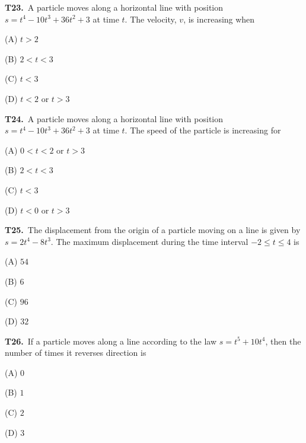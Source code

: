 \documentclass[11pt]{article}
\begin{document}
\bigskip\noindent\textbf{T23.}\ A particle moves along a horizontal line with position $s=t^4-10t^3+36t^2+3$ at time $t$. The velocity, $v$, is increasing when
\begin{list}{}{\setlength{\leftmargin}{3em}\setlength{\labelwidth}{2.5em}\setlength{\itemsep}{0pt}\setlength{\topsep}{2pt}}
\item[(A)] $t>2$
\item[(B)] $2<t<3$
\item[(C)] $t<3$
\item[(D)] $t<2$ or $t>3$
\end{list}

\bigskip\noindent\textbf{T24.}\ A particle moves along a horizontal line with position $s=t^4-10t^3+36t^2+3$ at time $t$. The speed of the particle is increasing for
\begin{list}{}{\setlength{\leftmargin}{3em}\setlength{\labelwidth}{2.5em}\setlength{\itemsep}{0pt}\setlength{\topsep}{2pt}}
\item[(A)] $0<t<2$ or $t>3$
\item[(B)] $2<t<3$
\item[(C)] $t<3$
\item[(D)] $t<0$ or $t>3$
\end{list}

\bigskip\noindent\textbf{T25.}\ The displacement from the origin of a particle moving on a line is given by $s = 2t^4-8t^3$. The maximum displacement during the time interval $-2 \leq t \leq 4$ is
\begin{list}{}{\setlength{\leftmargin}{3em}\setlength{\labelwidth}{2.5em}\setlength{\itemsep}{0pt}\setlength{\topsep}{2pt}}
\item[(A)] $54$
\item[(B)] $6$
\item[(C)] $96$
\item[(D)] $32$
\end{list}

\bigskip\noindent\textbf{T26.}\ If a particle moves along a line according to the law $s = t^5+10t^4$, then the number of times it reverses direction is
\begin{list}{}{\setlength{\leftmargin}{3em}\setlength{\labelwidth}{2.5em}\setlength{\itemsep}{0pt}\setlength{\topsep}{2pt}}
\item[(A)] $0$
\item[(B)] $1$
\item[(C)] $2$
\item[(D)] $3$
\end{list}
\end{document}
